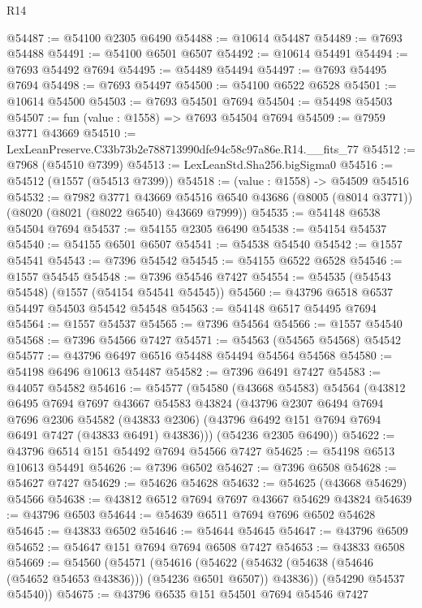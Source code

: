 \begin{lexlean}{R14}
\begin{coremodule}
@54487 := @54100 @2305 @6490
@54488 := @10614 @54487
@54489 := @7693 @54488
@54491 := @54100 @6501 @6507
@54492 := @10614 @54491
@54494 := @7693 @54492 @7694
@54495 := @54489 @54494
@54497 := @7693 @54495 @7694
@54498 := @7693 @54497
@54500 := @54100 @6522 @6528
@54501 := @10614 @54500
@54503 := @7693 @54501 @7694
@54504 := @54498 @54503
@54507 := fun (value : @1558) => @7693 @54504 @7694
@54509 := @7959 @3771 @43669
@54510 := LexLeanPreserve.C33b73b2e788713990dfe94c58c97a86e.R14.__fits_77
@54512 := @7968 (@54510 @7399)
@54513 := LexLeanStd.Sha256.bigSigma0
@54516 := @54512 (@1557 (@54513 @7399))
@54518 := (value : @1558) -> @54509 @54516
@54532 := @7982
    @3771
    @43669
    @54516
    @6540
    @43686
    (@8005 (@8014 @3771))
    (@8020 (@8021 (@8022 @6540) @43669 @7999))
@54535 := @54148 @6538 @54504 @7694
@54537 := @54155 @2305 @6490
@54538 := @54154 @54537
@54540 := @54155 @6501 @6507
@54541 := @54538 @54540
@54542 := @1557 @54541
@54543 := @7396 @54542
@54545 := @54155 @6522 @6528
@54546 := @1557 @54545
@54548 := @7396 @54546 @7427
@54554 := @54535 (@54543 @54548) (@1557 (@54154 @54541 @54545))
@54560 := @43796 @6518 @6537 @54497 @54503 @54542 @54548
@54563 := @54148 @6517 @54495 @7694
@54564 := @1557 @54537
@54565 := @7396 @54564
@54566 := @1557 @54540
@54568 := @7396 @54566 @7427
@54571 := @54563 (@54565 @54568) @54542
@54577 := @43796 @6497 @6516 @54488 @54494 @54564 @54568
@54580 := @54198 @6496 @10613 @54487
@54582 := @7396 @6491 @7427
@54583 := @44057 @54582
@54616 := @54577
    (@54580
      (@43668 @54583)
      @54564
      (@43812
        @6495
        @7694
        @7697
        @43667
        @54583
        @43824
        (@43796
          @2307
          @6494
          @7694
          @7696
          @2306
          @54582
          (@43833 @2306)
          (@43796 @6492 @151 @7694 @7694 @6491 @7427 (@43833 @6491) @43836)))
      (@54236 @2305 @6490))
@54622 := @43796 @6514 @151 @54492 @7694 @54566 @7427
@54625 := @54198 @6513 @10613 @54491
@54626 := @7396 @6502
@54627 := @7396 @6508
@54628 := @54627 @7427
@54629 := @54626 @54628
@54632 := @54625 (@43668 @54629) @54566
@54638 := @43812 @6512 @7694 @7697 @43667 @54629 @43824
@54639 := @43796 @6503
@54644 := @54639 @6511 @7694 @7696 @6502 @54628
@54645 := @43833 @6502
@54646 := @54644 @54645
@54647 := @43796 @6509
@54652 := @54647 @151 @7694 @7694 @6508 @7427
@54653 := @43833 @6508
@54669 := @54560
    (@54571
      (@54616
        (@54622 (@54632 (@54638 (@54646 (@54652 @54653 @43836))) (@54236 @6501 @6507)) @43836))
      (@54290 @54537 @54540))
@54675 := @43796 @6535 @151 @54501 @7694 @54546 @7427

\end{coremodule}
\end{lexlean}
